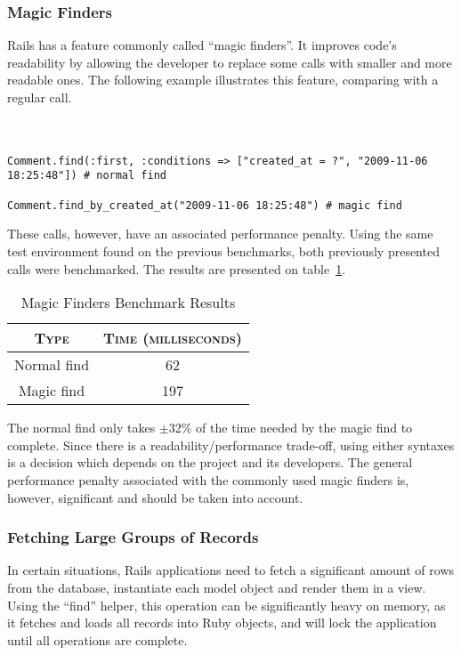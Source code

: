 \subsubsection{Magic Finders}
Rails has a feature commonly called ``magic finders''. It improves code's readability by allowing the developer to replace some calls with smaller and more readable ones. The following example illustrates this feature, comparing with a regular call.\\\\\\ %
\begin{lstlisting}[xleftmargin=30pt,xrightmargin=30pt]
Comment.find(:first, :conditions => ["created_at = ?", "2009-11-06 18:25:48"]) # normal find

Comment.find_by_created_at("2009-11-06 18:25:48") # magic find
\end{lstlisting}
These calls, however, have an associated performance penalty. Using the same test environment found on the previous benchmarks, both previously presented calls were benchmarked. The results are presented on table~\ref{tab:magic_finders}.
\begin{table}[h!t]
  \centering
  \caption{Magic Finders Benchmark Results}
  \label{tab:magic_finders}
  
  \begin{tabular}{c|c}
  
    \textbf{\textsc{Type}} & \textbf{\textsc{Time (milliseconds)}} \\ \hline
    Normal find & 62 \\ \hline
    Magic find & 197 \\
  \end{tabular}
\end{table}

The normal find only takes $\pm$32\% of the time needed by the magic find to complete. Since there is a readability/performance trade-off, using either syntaxes is a decision which depends on the project and its developers. The general performance penalty associated with the commonly used magic finders is, however, significant and should be taken into account.


\subsubsection{Fetching Large Groups of Records}
In certain situations, Rails applications need to fetch a significant amount of rows from the database, instantiate each model object and render them in a view. Using the ``find'' helper, this operation can be significantly heavy on memory, as it fetches and loads all records into Ruby objects, and will lock the application until all operations are complete.

